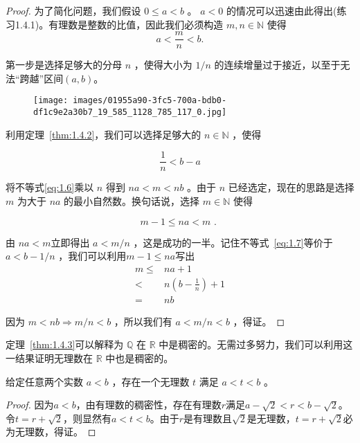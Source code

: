 \begin{proof}
为了简化问题，我们假设 \(0 \leq  a < b\) 。 \(a < 0\) 的情况可以迅速由此得出(练习1.4.1)。有理数是整数的比值，因此我们必须构造 \(m,n \in  \mathbb{N}\) 使得
\begin{equation}
\label{eq:1.6}
a < \frac{m}{n} < b.
\end{equation}

第一步是选择足够大的分母 \(n\) ，使得大小为 \(1/n\) 的连续增量过于接近，以至于无法“跨越”区间$(a, b)$。


\begin{figure}[h]
  \centering
\texttt{[image: images/01955a90-3fc5-700a-bdb0-df1c9e2a30b7\_19\_585\_1128\_785\_117\_0.jpg]}  
\end{figure}


利用定理~\ref{thm:1.4.2}，我们可以选择足够大的 \(n \in  \mathbb{N}\) ，使得

\begin{equation}
\label{eq:1.7}
\frac{1}{n} < b - a
\end{equation}

将不等式\eqref{eq:1.6}乘以 \(n\) 得到 \({na} < m < {nb}\) 。由于 \(n\) 已经选定，现在的思路是选择 \(m\) 为大于 \({na}\) 的最小自然数。换句话说，选择 \(m \in  \mathbb{N}\) 使得

\[
m - 1\le {na}  < m\text{ . }
\]

由 $na<m $立即得出 \(a < m/n\) ，这是成功的一半。记住不等式~\eqref{eq:1.7}等价于 \(a < b - 1/n\) ，我们可以利用$m-1\le na$写出
\begin{align*}
m \leq  &{na} + 1\\
< &n\left( {b - \frac{1}{n}}\right)  + 1\\
=& {nb}
\end{align*}

因为 \(m < {nb}\Rightarrow m/n < b\) ，所以我们有 \(a < m/n < b\) ，得证。  
\end{proof}

定理~\ref{thm:1.4.3}可以解释为 \(\mathbb{Q}\) 在 \(\mathbb{R}\) 中是稠密的。无需过多努力，我们可以利用这一结果证明无理数在 \(\mathbb{R}\) 中也是稠密的。


\begin{Cor}
  \label{cor:1.4.4}
  给定任意两个实数 \(a < b\) ，存在一个无理数 \(t\) 满足 \(a < t < b\) 。
\end{Cor}

\begin{proof}
  因为\(a < b\)，由有理数的稠密性，存在有理数\(r\)满足\(a - \sqrt{2} < r < b - \sqrt{2}\)。令\(t = r + \sqrt{2}\)，则显然有\(a < t < b\)。由于\(r\)是有理数且\(\sqrt{2}\)是无理数，\(t = r + \sqrt{2}\)必为无理数，得证。
\end{proof}


